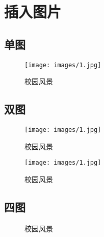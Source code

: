 \documentclass[12pt,a4paper]{article}%
\begin{document}
    \section{插入图片}
    \subsection{单图}
    \begin{figure}[H]%
	\centering
	\begin{minipage}{0.83\textwidth}%
		\centering
		\texttt{[image: images/1.jpg]}%
		\caption{\fontsize{10pt}{15pt}\selectfont 校园风景}%
        \label{fig:1}
	\end{minipage}
    \end{figure}

    \subsection{双图}
    \begin{figure}[H]%
            
    	\centering
    	\begin{minipage}{0.48\textwidth}
    		\centering
    		\texttt{[image: images/1.jpg]}
    		\caption{\fontsize{10pt}{15pt}\selectfont 校园风景}
    	\end{minipage}
    	\hspace{0cm}%
    	\hfill%
    	\begin{minipage}{0.48\textwidth}
    		\centering
    		\texttt{[image: images/1.jpg]}
    		\caption{\fontsize{10pt}{15pt}\selectfont 校园风景}
    	\end{minipage}
    \end{figure}
    \subsection{四图}
    \begin{figure}[htbp]
        \centering
        \quad
        \quad
        \quad
        \caption{ 校园风景}
    \end{figure}
    
\end{document}
